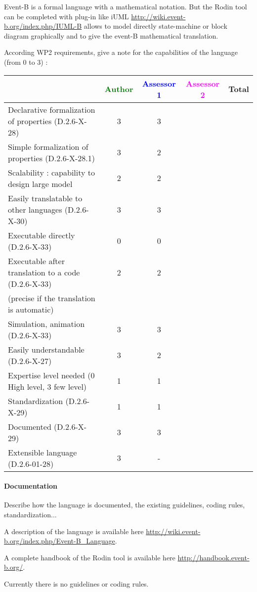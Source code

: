 \begin{author_comment}
Event-B  is a formal language with a mathematical notation. But the Rodin tool can be completed with plug-in like iUML \url{http://wiki.event-b.org/index.php/IUML-B} allows to model directly state-machine or block diagram  graphically and to  give the event-B mathematical translation.
\end{author_comment}

According WP2 requirements, give a note for the capabilities of the language (from 0 to 3) :

\begin{tabular}{|l | c | c | c | c|}
\hline
& \textcolor{green}{Author} & \textcolor{blue}{Assessor 1} & \textcolor{magenta}{Assessor 2} & Total \\
\hline
Declarative formalization of properties (D.2.6-X-28) & 3 & 3 & & \\
\hline
Simple formalization of properties (D.2.6-X-28.1) & 3 & 2 & & \\
\hline
Scalability : capability to design large model & 2 & 2 & & \\
\hline
Easily translatable to other languages (D.2.6-X-30) & 3 & 3 & & \\
\hline
Executable directly (D.2.6-X-33) & 0 & 0 & & \\
\hline
Executable after translation to a code (D.2.6-X-33) & 2 & 2 & & \\
(precise if the translation is automatic) & & & & \\
\hline
Simulation, animation (D.2.6-X-33) & 3 & 3 & & \\
\hline
Easily understandable (D.2.6-X-27) & 3 & 2 & & \\
\hline
Expertise level needed (0 High level, 3 few level) & 1 & 1 & & \\
\hline
Standardization (D.2.6-X-29) & 1 & 1 & & \\
\hline
Documented (D.2.6-X-29) & 3 & 3 & & \\
\hline
Extensible language (D.2.6-01-28) & 3 & - & & \\
\hline
\end{tabular}


\paragraph{Documentation} Describe how the language is documented, the existing guidelines, coding rules, standardization...

\begin{author_comment}
A description of the language is available here \url{http://wiki.event-b.org/index.php/Event-B_Language}.

A complete handbook of the Rodin tool is available  here \url{http://handbook.event-b.org/}.

Currently there is no guidelines or coding rules.
\end{author_comment}

